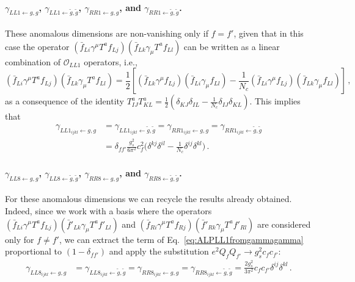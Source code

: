 \paragraph{\texorpdfstring{$\gamma_{LL1\leftarrow g,g}$, $\gamma_{LL1\leftarrow \tilde g, \tilde g}$, $\gamma_{RR1\leftarrow g,g}$, and $\gamma_{RR1\leftarrow \tilde g, \tilde g}$}{gamma LL1 and RR1 from two ALP-gluon couplings}.}
These anomalous dimensions are non-vanishing only if $f = f'$, given that in this case the
operator $(\bar f_{Li} \gamma^\mu T^a f_{Lj})(\bar f_{Lk} \gamma_\mu T^a f_{Ll})$ can
be written as a linear combination of $\mathcal O_{LL1}$ operators, i.e.,
\begin{equation}
    (\bar f_{Li} \gamma^\mu T^a f_{Lj})(\bar f_{Lk} \gamma_\mu T^a f_{Ll}) = \frac{1}{2}\!\left[(\bar f_{Lk} \gamma^\mu  f_{Lj})(\bar f_{Li} \gamma_\mu f_{Ll})-\frac{1}{N_c}
    (\bar f_{Li} \gamma^\mu  f_{Lj})(\bar f_{Lk} \gamma_\mu f_{Ll})
    \right]\!\,,
\end{equation}
as a consequence of the identity
$T^a_{IJ}T^a_{KL} = \frac{1}{2}(\delta_{KJ}\delta_{IL}-\frac{1}{N_c}\delta_{IJ}\delta_{KL})$.
This implies that
\begin{align}
    \gamma_{LL1_{ijkl} \leftarrow g,g } &=
    \gamma_{LL1_{ijkl} \leftarrow \tilde g, \tilde g} =
    \gamma_{RR1_{ijkl} \leftarrow g,g } =
    \gamma_{RR1_{ijkl} \leftarrow \tilde g, \tilde g}\nonumber \\
    &= \delta_{ff'}\frac{g_s^2}{6\pi^2}c_f^2 \bigg(
    \delta^{kj}\delta^{il}-\frac{1}{N_c}\delta^{ij}\delta^{kl}
    \bigg)\,.
\end{align}

\paragraph{\texorpdfstring{$\gamma_{LL8\leftarrow g,g}$, $\gamma_{LL8\leftarrow \tilde g, \tilde g}$, $\gamma_{RR8\leftarrow g,g}$, and $\gamma_{RR8\leftarrow \tilde g, \tilde g}$}{gamma LL8 and RR8 from two ALP-gluon couplings}.}
For these anomalous dimensions we can recycle the results already obtained.
Indeed, since we work with a basis where the operators
$(\bar f_{Li} \gamma^\mu T^a f_{Lj})(\bar f'_{Lk} \gamma_\mu T^a f'_{Ll})$ and
$(\bar f_{Ri} \gamma^\mu T^a f_{Rj})(\bar f'_{Rk} \gamma_\mu T^a f'_{Rl})$ are
considered only for $f\neq f'$, we can extract the term of
Eq.~\eqref{eq:ALPLL1fromgammagamma} proportional to $(1-\delta_{ff'})$ and apply the
substitution $e^2 Q_f Q_{f'} \to g_s^2 c_f c_{f'}$:
\begin{align}
    \gamma_{LL8_{ijkl} \leftarrow g,g } &=
    \gamma_{LL8_{ijkl} \leftarrow \tilde g, \tilde g} =
    \gamma_{RR8_{ijkl} \leftarrow g,g } =
    \gamma_{RR8_{ijkl} \leftarrow \tilde g, \tilde g}= \frac{2g_s^2}{3\pi^2 } c_f c_{f'}  \delta^{ij} \delta^{kl}\,.
\end{align}

